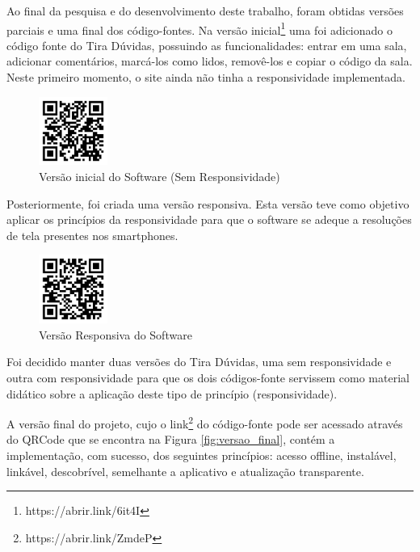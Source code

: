 \documentclass[12pt]{article}
\begin{document}
Ao final da pesquisa e do desenvolvimento deste trabalho, foram obtidas versões parciais e uma final dos código-fontes. Na versão inicial\footnote{https://abrir.link/6it4I} uma foi adicionado o código fonte do Tira Dúvidas, possuindo as funcionalidades: entrar em uma sala, adicionar comentários, marcá-los como lidos, removê-los e copiar o código da sala. Neste primeiro momento, o site ainda não tinha a responsividade implementada.

\begin{figure}[ht!]
\centering
\includegraphics[width=0.2\textwidth]{imagens/codigo_nao_responsivo.jpg}
\caption{Versão inicial do Software (Sem Responsividade)}
\label{fig:codigo_nao_responsivo}
\end{figure}

Posteriormente, foi criada uma versão responsiva. Esta versão teve como objetivo aplicar os princípios da responsividade para que o software se adeque a resoluções de tela presentes nos smartphones.

\begin{figure}[ht!]
\centering
\includegraphics[width=0.2\textwidth]{imagens/codigo_responsivo.jpg}
\caption{Versão Responsiva do Software}
\label{fig:codigo_responsivo}
\end{figure}

Foi decidido manter duas versões do Tira Dúvidas, uma sem responsividade e outra com responsividade para que  os dois códigos-fonte servissem como material didático sobre a aplicação deste tipo de princípio (responsividade).

A versão final do projeto, cujo o link\footnote{https://abrir.link/ZmdeP} do código-fonte pode ser acessado através do QRCode que se encontra na Figura \ref{fig:versao_final}, contém a implementação, com sucesso, dos seguintes princípios: acesso offline, instalável, linkável, descobrível, semelhante a aplicativo e atualização transparente.
\end{document}
